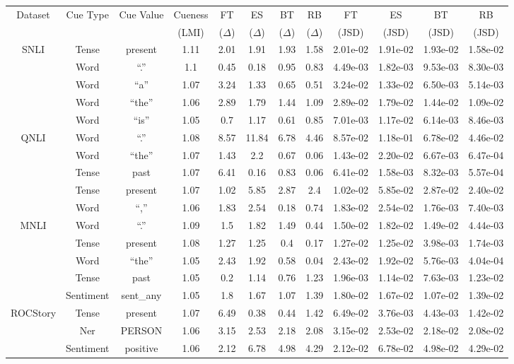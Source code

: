 \begin{table}[th]
\centering
\scriptsize
\begin{tabular}{c|c|c|c|c|c|c|c|c|c|c|c} \hline
Dataset & Cue Type &Cue Value & Cueness & FT  & ES & BT & RB & FT  & ES & BT & RB\\ 
	&	&  & (LMI)  & ($\Delta$)& ($\Delta$)& ($\Delta$) & ($\Delta$)& (JSD)& (JSD)& (JSD)& (JSD) \\ \hline
\multirow{5}{*}{SNLI} 
&Tense&present&1.11&2.01&1.91&1.93&1.58&2.01e-02&1.91e-02&1.93e-02&1.58e-02\\
&Word&``.''&1.1&0.45&0.18&0.95&0.83&4.49e-03&1.82e-03&9.53e-03&8.30e-03\\
&Word&``a''&1.07&3.24&1.33&0.65&0.51&3.24e-02&1.33e-02&6.50e-03&5.14e-03\\
&Word&``the''&1.06&2.89&1.79&1.44&1.09&2.89e-02&1.79e-02&1.44e-02&1.09e-02\\
&Word&``is''&1.05&0.7&1.17&0.61&0.85&7.01e-03&1.17e-02&6.14e-03&8.46e-03\\
	   \hline 
\multirow{5}{*}{QNLI} 
&Word&``.''&1.08&8.57&11.84&6.78&4.46&8.57e-02&1.18e-01&6.78e-02&4.46e-02\\
&Word&``the''&1.07&1.43&2.2&0.67&0.06&1.43e-02&2.20e-02&6.67e-03&6.47e-04\\
&Tense&past&1.07&6.41&0.16&0.83&0.06&6.41e-02&1.58e-03&8.32e-03&5.57e-04\\
&Tense&present&1.07&1.02&5.85&2.87&2.4&1.02e-02&5.85e-02&2.87e-02&2.40e-02\\
&Word&``,''&1.06&1.83&2.54&0.18&0.74&1.83e-02&2.54e-02&1.76e-03&7.40e-03\\
	   \hline 
\multirow{5}{*}{MNLI} 
&Word&``.''&1.09&1.5&1.82&1.49&0.44&1.50e-02&1.82e-02&1.49e-02&4.44e-03\\
&Tense&present&1.08&1.27&1.25&0.4&0.17&1.27e-02&1.25e-02&3.98e-03&1.74e-03\\
&Word&``the''&1.05&2.43&1.92&0.58&0.04&2.43e-02&1.92e-02&5.76e-03&4.04e-04\\
&Tense&past&1.05&0.2&1.14&0.76&1.23&1.96e-03&1.14e-02&7.63e-03&1.23e-02\\
&Sentiment&sent\_any&1.05&1.8&1.67&1.07&1.39&1.80e-02&1.67e-02&1.07e-02&1.39e-02\\
	   \hline 
\multirow{5}{*}{ROCStory} 
&Tense&present&1.07&6.49&0.38&0.44&1.42&6.49e-02&3.76e-03&4.43e-03&1.42e-02\\
&Ner&PERSON&1.06&3.15&2.53&2.18&2.08&3.15e-02&2.53e-02&2.18e-02&2.08e-02\\
&Sentiment&positive&1.06&2.12&6.78&4.98&4.29&2.12e-02&6.78e-02&4.98e-02&4.29e-02\\

\end{tabular}
\end{table}
